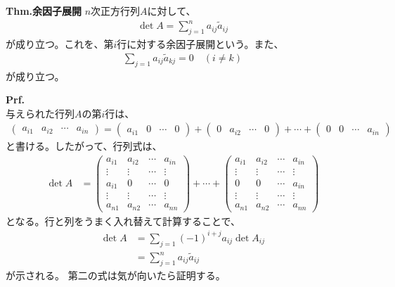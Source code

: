 \documentclass[a4paper,11pt]{jsarticle}
\numberwithin{equation}{section}
\begin{document}
\begin{itembox}[l]{\textbf{Thm.余因子展開}}
  $n$次正方行列$A$に対して、
  \begin{align}
    \det A = \sum_{j=1}^n a_{ij} \tilde{a}_{ij}
  \end{align}
  が成り立つ。これを、第$i$行に対する余因子展開という。また、
  \begin{align}
    \sum_{j=1} a_{ij} \tilde{a}_{kj} = 0 \quad (i \neq k)
  \end{align}
  が成り立つ。
\end{itembox}
\textbf{Prf.}\\
与えられた行列$A$の第$i$行は、
\begin{align}
  \begin{pmatrix}
    a_{i1} & a_{i2} & \cdots & a_{in}
  \end{pmatrix}
  =
  \begin{pmatrix}
    a_{i1} & 0 & \cdots & 0
  \end{pmatrix}
  +
  \begin{pmatrix}
    0 & a_{i2} & \cdots & 0
  \end{pmatrix}
  +\cdots
  +
  \begin{pmatrix}
    0 & 0 & \cdots & a_{in}
  \end{pmatrix}
\end{align}
と書ける。したがって、行列式は、
\begin{align}
  \det A &= 
  \begin{pmatrix}
    a_{i1} & a_{i2} & \cdots & a_{in}\\
    \vdots & \vdots & \cdots & \vdots\\
    a_{i1} & 0 & \cdots & 0\\
    \vdots & \vdots & \cdots & \vdots\\
    a_{n1} & a_{n2} & \cdots & a_{nn}
  \end{pmatrix}
  +\cdots
  +
  \begin{pmatrix}
    a_{i1} & a_{i2} & \cdots & a_{in}\\
    \vdots & \vdots & \cdots & \vdots\\
    0 & 0 & \cdots & a_{in}\\
    \vdots & \vdots & \cdots & \vdots\\
    a_{n1} & a_{n2} & \cdots & a_{nn}
  \end{pmatrix}
\end{align}
となる。行と列をうまく入れ替えて計算することで、
\begin{align}
  \det A &= \sum_{j=1}(-1)^{i+j}a_{ij}\det A_{ij}\\
  &=\sum_{j=1}^n a_{ij} \tilde{a}_{ij}
\end{align}
が示される。
第二の式は気が向いたら証明する。\hfill\qedsymbol\\
\end{document}
